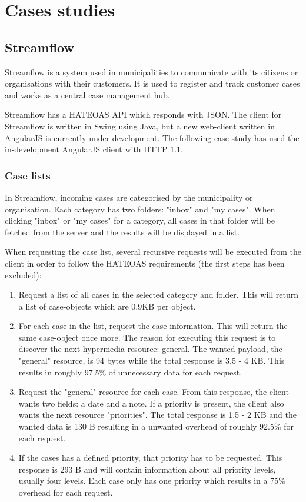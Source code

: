 \documentclass{cslthse-msc}
\begin{document}
\chapter{Cases studies}
\section{Streamflow}
Streamflow\cite{streamflow} is a system used in municipalities to communicate with its citizens or organisations with their customers. It is used to register and track customer cases and works as a central case management hub.

Streamflow has a HATEOAS API which responds with JSON. The client for Streamflow is written in Swing using Java, but a new web-client written in AngularJS is currently under development. The following case study has used the in-development AngularJS client with HTTP 1.1.

\subsection{Case lists}
In Streamflow, incoming cases are categorised by the municipality or organisation. Each category has two folders: "inbox" and "my cases". When clicking "inbox" or "my cases" for a category, all cases in that folder will be fetched from the server and the results will be displayed in a list.

When requesting the case list, several recursive requests will be executed from the client in order to follow the HATEOAS requirements (the first steps has been excluded):

\begin{enumerate}
	\item Request a list of all cases in the selected category and folder. This will return a list of case-objects which are 0.9KB per object.
	\item For each case in the list, request the case information. This will return the same case-object once more. The reason for executing this request is to discover the next hypermedia resource: general. The wanted payload, the "general" resource, is 94 bytes while the total response is 3.5 - 4 KB. This results in roughly 97.5\% of unnecessary data for each request.
	\item Request the "general" resource for each case. From this response, the client wants two fields: a date and a note. If a priority is present, the client also wants the next resource "priorities". The total response is 1.5 - 2 KB and the wanted data is 130 B resulting in a unwanted overhead of roughly 92.5\% for each request.
	\item If the cases has a defined priority, that priority has to be requested. This response is 293 B and will contain information about all priority levels, usually four levels. Each case only has one priority which results in a 75\% overhead for each request.
\end{enumerate}
\end{document}
